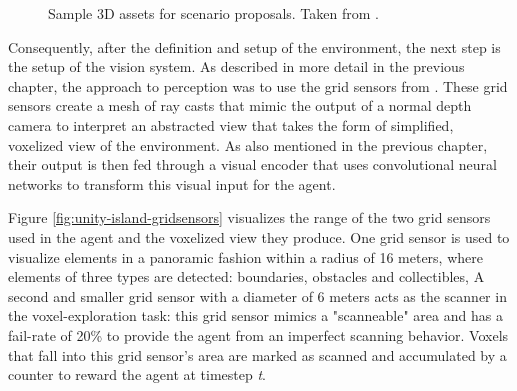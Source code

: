 \begin{figure}[!ht]
    \centering
    \caption{Sample 3D assets for scenario proposals. Taken from \cite{unity-asset-store}.}
    \label{fig:unity-islands-bigsmall}
\end{figure}

Consequently, after the definition and setup of the environment, the next step is the setup of the vision system. As described in more detail in the previous chapter, the approach to perception was to use the grid sensors from \cite{github-unity-mlagents-toolkit, github-mbaske-gridsensor}. These grid sensors create a mesh of ray casts that mimic the output of a normal depth camera to interpret an abstracted view that takes the form of simplified, voxelized view of the environment. As also mentioned in the previous chapter, their output is then fed through a visual encoder that uses convolutional neural networks to transform this visual input for the agent. 

Figure \ref{fig:unity-island-gridsensors} visualizes the range of the two grid sensors used in the agent and the voxelized view they produce. One grid sensor is used to visualize elements in a panoramic fashion within a radius of 16 meters, where elements of three types are detected: boundaries, obstacles and collectibles, A second and smaller grid sensor with a diameter of 6 meters acts as the scanner in the voxel-exploration task: this grid sensor mimics a "scanneable" area and has a fail-rate of 20\% to provide the agent from an imperfect scanning behavior. Voxels that fall into this grid sensor's area are marked as scanned and accumulated by a counter to reward the agent at timestep \textit{t}. 

